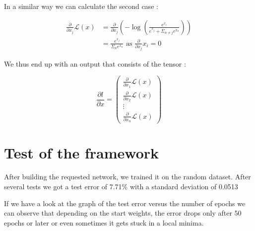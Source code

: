 \documentclass{article}
\begin{document}
In a similar way we can calculate the second case : 

\begin{equation}
\begin{split}
\frac{\partial}{\partial x_j} \mathcal{L}(x) & = \frac{\partial}{\partial x_j} \left( - \log \left( \frac{e^{x_i}}{e^{x_j} + \Sigma_{n \ne j} e^{x_n}} \right)\right) \\
 & = \frac{e^{x_j}}{\Sigma_{n} e^{x_n}} \text{ as } \frac{\partial}{\partial x_j} x_i = 0
\end{split}
\end{equation}


We thus end up with an output that consists of the tensor :


\[\frac{\partial l}{\partial x} = \begin{pmatrix}
									\frac{\partial}{\partial x_1}\mathcal{L}(x) \\
									\frac{\partial}{\partial x_2}\mathcal{L}(x) \\
									\vdots \\
									\frac{\partial}{\partial x_n}\mathcal{L}(x) 
								  \end{pmatrix} \]
								  

\section{Test of the framework}

After building the requested network, we trained it on the random dataset. After several tests we got a test error of 7.71\% with a standard deviation of 0.0513

If we have a look at the graph of the test error versus the number of epochs we can observe that depending on the start weights, the error drops only after 50 epochs or later or even sometimes it gets stuck in a local minima.   
\end{document}

